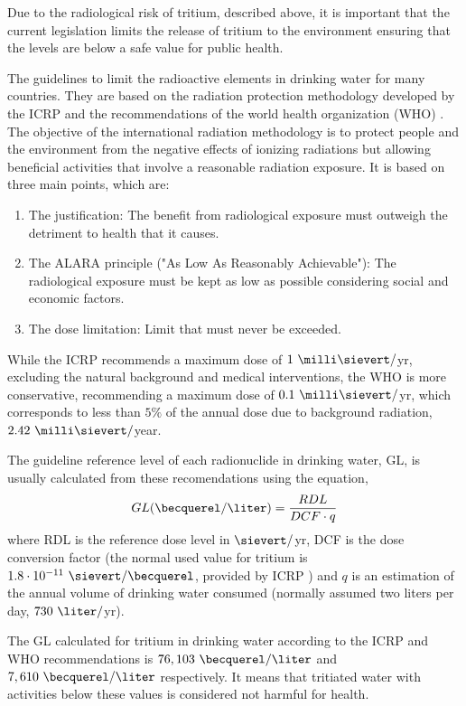 Due to the radiological risk of tritium, described above, it is important that the current legislation limits the release of tritium to the environment ensuring that the levels are below a safe value for public health.

The guidelines to limit the radioactive elements in drinking water for many countries. They are based on the radiation protection methodology developed by the ICRP \cite{ICRP_GL} and the recommendations of the world health organization (WHO) \cite{WHO_GL}. The objective of the international radiation methodology is to  protect people and the environment from the negative effects of ionizing radiations but allowing beneficial activities that involve a reasonable radiation exposure. It is based on three main points, which are:
\begin{enumerate}
\item{} The justification: The benefit from radiological exposure must outweigh the detriment to health that it causes.
\item{} The ALARA principle ("As Low As Reasonably Achievable"): The radiological exposure must be kept as low as possible considering social and economic factors.
\item{} The dose limitation: Limit that must never be exceeded.
\end{enumerate}

While the ICRP recommends a maximum dose of $1~\milli\sievert/$yr, excluding the natural background and medical interventions, the WHO is more conservative, recommending a maximum dose of $0.1~\milli\sievert/$yr, which corresponds to less than $5\%$ of the annual dose due to background radiation, $2.42~\milli\sievert/$year.

The guideline reference level of each radionuclide in drinking water, GL, is usually calculated from these recomendations using the equation,
\begin{equation}
GL (\becquerel/\liter) = \frac{RDL}{DCF \cdot{} q}
\label{eq:Guideline}
\end{equation}
where RDL is the reference dose level in $\sievert/$yr, DCF is the dose conversion factor (the normal used value for tritium is $1.8 \cdot{} 10^{-11}~\sievert/ \becquerel$, provided by ICRP \cite{ICRP_factor}) and $q$ is an estimation of the annual volume of drinking water consumed (normally assumed two liters per day, $730~\liter/$yr).

The GL calculated for tritium in drinking water according to the ICRP and WHO recommendations is $76,103~\becquerel/\liter$ and $7,610~\becquerel/\liter$  respectively. It means that tritiated water with activities below these values is considered not harmful for health.

